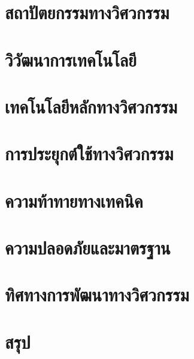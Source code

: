 \documentclass[12pt,a4paper]{article}
\begin{document}
\section{สถาปัตยกรรมทางวิศวกรรม}

\section{วิวัฒนาการเทคโนโลยี}

\section{เทคโนโลยีหลักทางวิศวกรรม}

\section{การประยุกต์ใช้ทางวิศวกรรม}

\section{ความท้าทายทางเทคนิค}

\section{ความปลอดภัยและมาตรฐาน}

\section{ทิศทางการพัฒนาทางวิศวกรรม}

\section{สรุป}

\printbibliography[title=เอกสารอ้างอิง]
\end{document}
